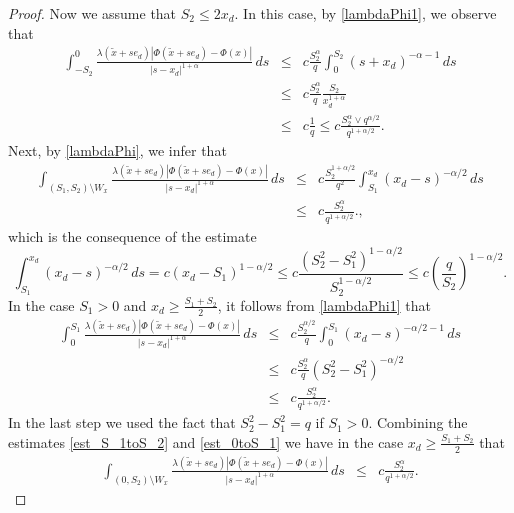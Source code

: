 \documentclass[a4paper,12pt,reqno]{amsart}
\theoremstyle{definition}
\theoremstyle{remark}
\begin{document}
\begin{proof}
Now we assume that  $S_2\le 2x_d$. 
In this case,  by \eqref{lambdaPhi1}, we observe that  
\begin{eqnarray}
\int_{-S_2}^{0} 
\frac{\lambda(\tilde{x} + s e_d) |\varPhi(\tilde{x} + s e_d) - \varPhi(x)|}{|s - x_d|^{1 + \alpha}} \, ds 
&\le&  c\frac{S^{\alpha}_2}{q }\int_{0}^{S_2} (s+x_d)^{-\alpha-1}\, ds\nonumber\\
&\le& c\frac{S^{\alpha}_2}{q }\frac {S_2} {x_d^{1+\alpha}} \nonumber\\
&\le& c\frac{1}{q } 
\le c\frac{S^{\alpha}_2\vee q^{\alpha/2}}{q^{1+\alpha/2} }.\label{est-S_2}
\end{eqnarray}
Next, by \eqref{lambdaPhi}, we infer that
\begin{eqnarray}
\int_{(S_1, S_2) \setminus W_x}
\frac{\lambda(\tilde{x} + s e_d) |\varPhi(\tilde{x} + s e_d) - \varPhi(x)|}{|s - x_d|^{1 + \alpha}} \, ds 
&\le&  c\frac{S^{1+\alpha/2}_2}{q^{2} } \int_{S_1}^{ x_d} (x_d - s)^{-\alpha/2}\, ds \nonumber\\
&\le& c\frac{S^{\alpha}_2}{q^{1+\alpha/2} }.\label{est_S_1toS_2}, 
\end{eqnarray} 
which is the consequence of the estimate
$$\int_{S_1}^{ x_d} (x_d - s)^{-\alpha/2}\, ds= c(x_d-S_1)^{1-\alpha/2}\le c\frac{(S^2_2-S^2_1)^{1-\alpha/2}}{S_2^{1-\alpha/2}}\le c \left(\frac{q}{S_2}\right)^{1-\alpha/2}.$$ 
In the case  $S_1 > 0$ and $ x_d\ge \frac{S_1+S_2}2$, it follows from \eqref{lambdaPhi1} that
\begin{eqnarray}
\int_{0}^{S_1} 
\frac{\lambda(\tilde{x} + s e_d) |\varPhi(\tilde{x} + s e_d) - \varPhi(x)|}{|s - x_d|^{1 + \alpha}} \, ds 
&\le&  c\frac{S^{\alpha/2}_2}{q }\int_{0}^{ S_1} (x_d - s)^{-\alpha/2-1}\, ds \nonumber\\
&\le& c\frac{S^{\alpha}_2}{q } (S^2_2-S^2_1)^{-\alpha/2}\nonumber\\
&\le& c\frac{S^{\alpha}_2}{q^{1+\alpha/2} }. \label{est_0toS_1}
\end{eqnarray} 
In the last step we used the fact that $S^2_2-S^2_1=q$ if $S_1>0$. 
Combining  the estimates \eqref{est_S_1toS_2} and \eqref{est_0toS_1}  we have in the case $x_d\ge \frac{S_1+S_2}2$ that
\begin{eqnarray}
\int_{(0, S_2) \setminus W_x}
\frac{\lambda(\tilde{x} + s e_d) |\varPhi(\tilde{x} + s e_d) - \varPhi(x)|}{|s - x_d|^{1 + \alpha}} \, ds 
&\le&  c\frac{S^{\alpha}_2}{q^{1+\alpha/2} }.\label{0toS_2W}
\end{eqnarray}


\end{proof}
\end{document}
